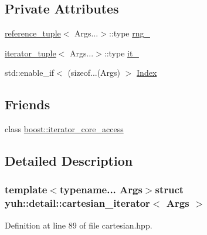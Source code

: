 \subsection*{\-Private \-Attributes}
\begin{DoxyCompactItemize}
\item 
\hyperlink{structyuh_1_1detail_1_1reference__tuple}{reference\-\_\-tuple}$<$ \-Args...$>$\-::type \hyperlink{structyuh_1_1detail_1_1cartesian__iterator_ad2ccb094e1179a6053313017b093b100}{rng\-\_\-}
\item 
\hyperlink{structyuh_1_1detail_1_1iterator__tuple}{iterator\-\_\-tuple}$<$ \-Args...$>$\-::type \hyperlink{structyuh_1_1detail_1_1cartesian__iterator_a3be2fc4dce5bf688bebabf6767e81a80}{it\-\_\-}
\item 
std\-::enable\-\_\-if$<$ (sizeof...(\-Args) $>$ \hyperlink{structyuh_1_1detail_1_1cartesian__iterator_ad246a90285e74f351a7fb7afc43c0348}{\-Index}
\end{DoxyCompactItemize}
\subsection*{\-Friends}
\begin{DoxyCompactItemize}
\item 
class \hyperlink{structyuh_1_1detail_1_1cartesian__iterator_ac09f73e325921cc50ebcd96bed0f8096}{boost\-::iterator\-\_\-core\-\_\-access}
\end{DoxyCompactItemize}


\subsection{\-Detailed \-Description}
\subsubsection*{template$<$typename... \-Args$>$struct yuh\-::detail\-::cartesian\-\_\-iterator$<$ Args $>$}



\-Definition at line 89 of file cartesian.\-hpp.



